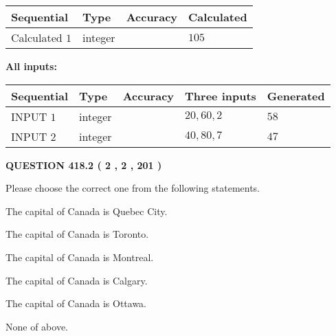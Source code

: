 \documentclass[12pt]{article}
\begin{document}
   
   
   
\noindent{}
   
   
  
  
\noindent\begin{tabular}{|l|l|l|l|}
\hline
 Sequential & Type & Accuracy & Calculated \\ 
\hline
 
 
  Calculated $  1 $ & integer &  & 
  $ 105 $ 
 \\  \hline  
 \end{tabular}
   
   
   
   
\noindent\vspace{0.1in}\hspace{-0.08in} {\textbf{\Large{All inputs: }}}
   
   
  
  
\noindent\begin{tabular}{|l|l|l|l|l|}
\hline
 Sequential & Type & Accuracy & Three inputs & Generated \\ 
\hline
 
 
  INPUT $  1 $ & integer &  & $
 20
 , 
 60
 , 
 2
 $ & $ 58 $ 
 \\  \hline  
 
 
  INPUT $  2 $ & integer &  & $
 40
 , 
 80
 , 
 7
 $ & $ 47 $ 
 \\  \hline  
 \end{tabular}
   
   
  
\vspace{0.2in}
  
{\textbf{\Large{QUESTION
418.2 
 ( 2 , 2 , 201 )
}}}
  
  
Please choose the correct one from the following statements.
 
 
The capital of Canada is Quebec City.
 
 
The capital of Canada is Toronto.
 
 
The capital of Canada is Montreal.
 
 
The capital of Canada is Calgary.
 
 
The capital of Canada is Ottawa.
 
 
 None of above.
 
 
\noindent{}
 
\end{document}
